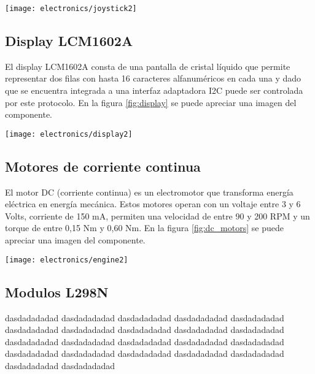 \begin{center}
    \texttt{[image: electronics/joystick2]}
    \label{fig:joystick}
\end{center}


\subsection{Display LCM1602A}
El display LCM1602A \cite{LCM1602A_datasheet} consta de una pantalla de cristal líquido que permite representar dos filas con hasta 16 caracteres alfanuméricos en cada una y dado que se encuentra integrada a una interfaz adaptadora I2C puede ser controlada por este protocolo. En la figura \ref{fig:display} se puede apreciar una imagen del componente.

\begin{center}
    \texttt{[image: electronics/display2]}
    \label{fig:display}
\end{center}

\subsection{Motores de corriente continua}
El motor DC (corriente continua) \cite{dc_motor_datasheet} es un electromotor que transforma energía eléctrica en energía mecánica. Estos motores operan con un voltaje entre 3 y 6 Volts, corriente de 150 mA, permiten una velocidad de entre 90 y 200 RPM y un torque de entre 0,15 Nm y 0,60 Nm. En la figura \ref{fig:dc_motors} se puede apreciar una imagen del componente.


\begin{center}
  \texttt{[image: electronics/engine2]}
    \label{fig:dc_motors}
\end{center}
  


\subsection{Modulos L298N}
dasdadadadad dasdadadadad dasdadadadad dasdadadadad dasdadadadad dasdadadadad dasdadadadad dasdadadadad dasdadadadad dasdadadadad dasdadadadad dasdadadadad dasdadadadad dasdadadadad dasdadadadad dasdadadadad dasdadadadad dasdadadadad dasdadadadad dasdadadadad dasdadadadad dasdadadadad 

